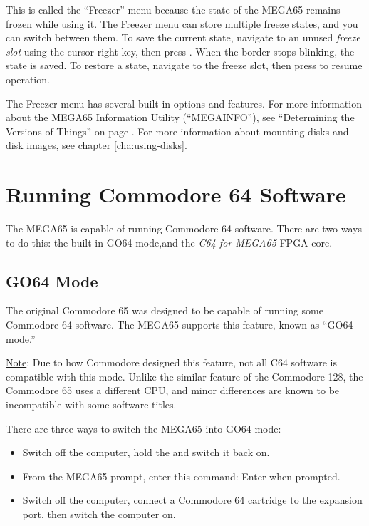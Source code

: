 This is called the ``Freezer'' menu because the state of the MEGA65 remains frozen while using it. The Freezer menu can store multiple freeze states, and you can switch between them. To save the current state, navigate to an unused {\it freeze slot} using the cursor-right key, then press . When the border stops blinking, the state is saved. To restore a state, navigate to the freeze slot, then press  to resume operation.

The Freezer menu has several built-in options and features. For more information about the MEGA65 Information Utility (``MEGAINFO''), see ``Determining the Versions of Things'' on page \pageref{sec:versions}. For more information about mounting disks and disk images, see chapter \vref{cha:using-disks}.


\section{Running Commodore 64 Software}

The MEGA65 is capable of running Commodore 64 software. There are two ways to do this: the built-in GO64 mode,and the {\it C64 for MEGA65} FPGA core.

\subsection{GO64 Mode}

The original Commodore 65 was designed to be capable of running some Commodore 64 software. The MEGA65 supports this feature, known as ``GO64 mode.''

\underline{Note}: Due to how Commodore designed this feature, not all C64 software is compatible with this mode. Unlike the similar feature of the Commodore 128, the Commodore 65 uses a different CPU, and minor differences are known to be incompatible with some software titles.

There are three ways to switch the MEGA65 into GO64 mode:

\begin{itemize}
    \item Switch off the computer, hold the \megasymbolkey and switch it back on.
    \item From the MEGA65  prompt, enter this command:  Enter  when prompted.
    \item Switch off the computer, connect a Commodore 64 cartridge to the expansion port, then switch the computer on.
\end{itemize}

